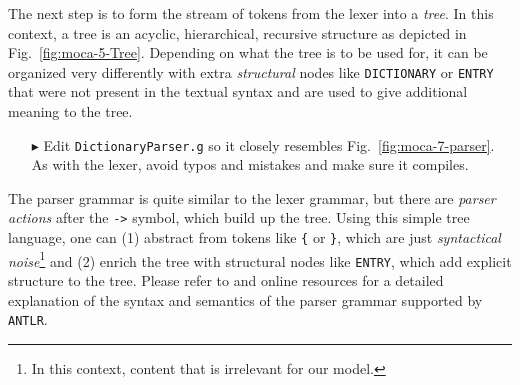The next step is to form the stream of tokens from the lexer into a \emph{tree}.
In this context, a tree is an acyclic, hierarchical, recursive structure as depicted in Fig.~\ref{fig:moca-5-Tree}.
Depending on what the tree is to be used for, it can be organized very differently with extra \emph{structural} nodes like \texttt{DICTIONARY} or \texttt{ENTRY} that were not present in the textual syntax and are used to give additional meaning to the tree. 


\begin{enumerate}
\item[$\blacktriangleright$] Edit \texttt{DictionaryParser.g} so it closely resembles Fig.~\ref{fig:moca-7-parser}.
As with the lexer, avoid typos and mistakes and make sure it compiles.
\end{enumerate}


The parser grammar is quite similar to the lexer grammar, but there are \emph{parser actions} after the \texttt{->} symbol, which build up the tree.
Using this simple tree language, one can (1) abstract from tokens like \texttt{\{} or \texttt{\}}, which are just \emph{syntactical noise}\footnote{In this context, content that is irrelevant for our model.} and (2) enrich the tree with structural nodes like \texttt{ENTRY}, which add explicit structure to the tree.
Please refer to \cite{ANTLR} and online resources for a detailed explanation of the syntax and semantics of the parser grammar supported by \texttt{ANTLR}. 
 

